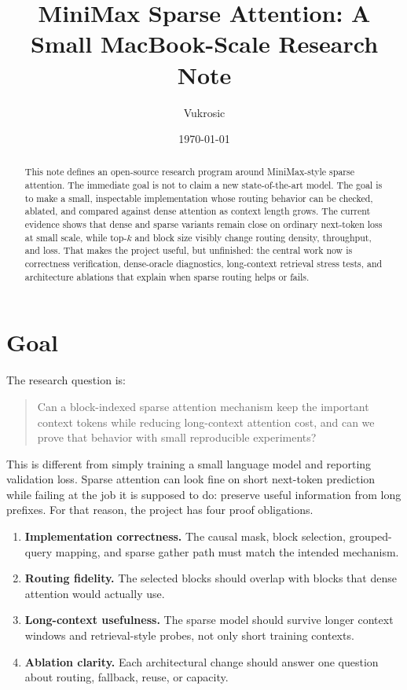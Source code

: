 \documentclass[11pt]{article}
\title{MiniMax Sparse Attention: A Small MacBook-Scale Research Note}
\author{Vukrosic}
\date{\today}
\begin{document}
\maketitle

\begin{abstract}
This note defines an open-source research program around MiniMax-style sparse attention.
The immediate goal is not to claim a new state-of-the-art model.
The goal is to make a small, inspectable implementation whose routing behavior can be checked, ablated, and compared against dense attention as context length grows.
The current evidence shows that dense and sparse variants remain close on ordinary next-token loss at small scale, while top-$k$ and block size visibly change routing density, throughput, and loss.
That makes the project useful, but unfinished: the central work now is correctness verification, dense-oracle diagnostics, long-context retrieval stress tests, and architecture ablations that explain when sparse routing helps or fails.
\end{abstract}

\section{Goal}
The research question is:
\begin{quote}
Can a block-indexed sparse attention mechanism keep the important context tokens while reducing long-context attention cost, and can we prove that behavior with small reproducible experiments?
\end{quote}

This is different from simply training a small language model and reporting validation loss.
Sparse attention can look fine on short next-token prediction while failing at the job it is supposed to do: preserve useful information from long prefixes.
For that reason, the project has four proof obligations.

\begin{enumerate}[leftmargin=1.5em]
  \item \textbf{Implementation correctness.} The causal mask, block selection, grouped-query mapping, and sparse gather path must match the intended mechanism.
  \item \textbf{Routing fidelity.} The selected blocks should overlap with blocks that dense attention would actually use.
  \item \textbf{Long-context usefulness.} The sparse model should survive longer context windows and retrieval-style probes, not only short training contexts.
  \item \textbf{Ablation clarity.} Each architectural change should answer one question about routing, fallback, reuse, or capacity.
\end{enumerate}
\end{document}
